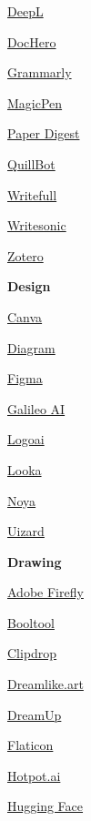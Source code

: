 \documentclass[
]{book}
\begin{document}
\href{https://www.deepl.com/en/translator}{DeepL}

\href{https://www.dochero.ai/en}{DocHero}

\href{https://www.grammarly.com/plagiarism-checker}{Grammarly}

\href{https://magickpen.com/}{MagicPen}

\href{https://www.paperdigest.org/review/}{Paper Digest}

\href{https://quillbot.com/}{QuillBot}

\href{https://www.writefull.com/}{Writefull}

\href{https://writesonic.com/}{Writesonic}

\href{https://www.zotero.org/}{Zotero}

\textbf{Design}

\href{https://www.canva.com/templates/}{Canva}

\href{https://diagram.com/}{Diagram}

\href{https://www.figma.com/}{Figma}

\href{https://www.usegalileo.ai/explore}{Galileo AI}

\href{https://www.logoai.com/logo-maker}{Logoai}

\href{https://looka.com/}{Looka}

\href{https://www.noya.io/ui}{Noya}

\href{https://uizard.io/templates/}{Uizard}

\textbf{Drawing}

\href{https://www.adobe.com/products/firefly.html?gclid=Cj0KCQjwk6SwBhDPARIsAJ59Gwd5ryWm7_kkdRXLvJCASelBPtk88u8PidKCH0UEBeuP_89Y1cbLY6gaAnLmEALw_wcB\&sdid=JM4FW6VL\&mv=search\&mv2=paidsearch\&ef_id=Cj0KCQjwk6SwBhDPARIsAJ59Gwd5ryWm7_kkdRXLvJCASelBPtk88u8PidKCH0UEBeuP_89Y1cbLY6gaAnLmEALw_wcB:G:s\&s_kwcid=AL!3085!3!677394754238!e!!g!!adobe\%20firefly!19870733758!148140507838\&gad_source=1}{Adobe Firefly}

\href{https://booltool.boolv.tech/home}{Booltool}

\href{https://clipdrop.co/}{Clipdrop}

\href{https://dreamlike.art/}{Dreamlike.art}

\href{https://www.dreamup.com/}{DreamUp}

\href{https://www.flaticon.com/}{Flaticon}

\href{https://hotpot.ai/}{Hotpot.ai}

\href{https://huggingface.co/spaces/stabilityai/stable-diffusion}{Hugging Face}
\end{document}
